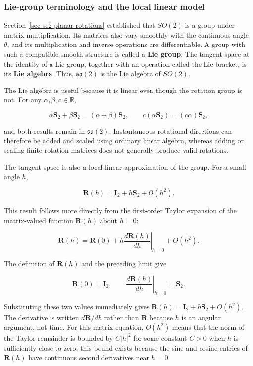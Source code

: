 \documentclass[
  australian,
  12pt,
  letterpaper,
  DIV=11,
  numbers=noendperiod,
  twoside]{scrreprt}
\begin{document}
\subsubsection{Lie-group terminology and the local linear
model}\label{lie-group-terminology-and-the-local-linear-model}

Section~\ref{sec-se2-planar-rotations} established that \(SO(2)\) is a
group under matrix multiplication. Its matrices also vary smoothly with
the continuous angle \(\theta\), and its multiplication and inverse
operations are differentiable. A group with such a compatible smooth
structure is called a \textbf{Lie group}. The tangent space at the
identity of a Lie group, together with an operation called the Lie
bracket, is its \textbf{Lie algebra}. Thus, \(\mathfrak{so}(2)\) is the
Lie algebra of \(SO(2)\).

The Lie algebra is useful because it is linear even though the rotation
group is not. For any \(\alpha,\beta,c\in\mathbb R\),

\[
\alpha\mathbf S_2+\beta\mathbf S_2
=
(\alpha+\beta)\mathbf S_2,
\qquad
c(\alpha\mathbf S_2)
=
(c\alpha)\mathbf S_2,
\]

and both results remain in \(\mathfrak{so}(2)\). Instantaneous
rotational directions can therefore be added and scaled using ordinary
linear algebra, whereas adding or scaling finite rotation matrices does
not generally produce valid rotations.

The tangent space is also a local linear approximation of the group. For
a small angle \(h\),

\[
\boxed{
\mathbf R(h)
=
\mathbf I_2
+h\mathbf S_2
+O(h^2)
}.
\]

This result follows more directly from the first-order Taylor expansion
of the matrix-valued function \(\mathbf R(h)\) about \(h=0\):

\[
\mathbf R(h)
=
\mathbf R(0)
+h
\left.
\frac{d\mathbf R(h)}{dh}
\right|_{h=0}
+O(h^2).
\]

The definition of \(\mathbf R(h)\) and the preceding limit give

\[
\mathbf R(0)=\mathbf I_2,
\qquad
\left.
\frac{d\mathbf R(h)}{dh}
\right|_{h=0}
=
\mathbf S_2.
\]

Substituting these two values immediately gives
\(\mathbf R(h)=\mathbf I_2+h\mathbf S_2+O(h^2)\). The derivative is
written \(d\mathbf R/dh\) rather than \(\dot{\mathbf R}\) because \(h\)
is an angular argument, not time. For this matrix equation, \(O(h^2)\)
means that the norm of the Taylor remainder is bounded by \(C|h|^2\) for
some constant \(C>0\) when \(h\) is sufficiently close to zero; this
bound exists because the sine and cosine entries of \(\mathbf R(h)\)
have continuous second derivatives near \(h=0\).
\end{document}

